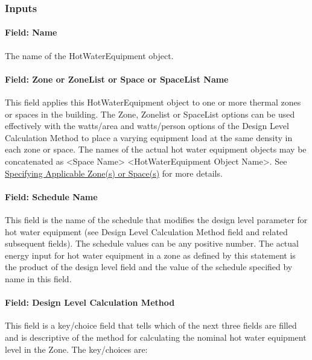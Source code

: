 \subsubsection{Inputs}\label{inputs-5-015}

\paragraph{Field: Name}\label{field-name-5-011}

The name of the HotWaterEquipment object.

\paragraph{Field: Zone or ZoneList or Space or SpaceList Name}\label{hweq-field-zone-or-zonelist-name-000}

This field applies this HotWaterEquipment object to one or more thermal zones or spaces in the building. The Zone, Zonelist or SpaceList options can be used effectively with the watts/area and watts/person options of the Design Level Calculation Method to place a varying equipment load at the same density in each zone or space. The names of the actual hot water equipment objects may be concatenated as \textless{}Space Name\textgreater{} \textless{}HotWaterEquipment Object Name\textgreater{}. See \hyperref[specifying-applicable-zones-or-spaces]{Specifying Applicable Zone(s) or Space(s)} for more details.

\paragraph{Field: Schedule Name}\label{field-schedule-name-3-000}

This field is the name of the schedule that modifies the design level parameter for hot water equipment (see Design Level Calculation Method field and related subsequent fields). The schedule values can be any positive number. The actual energy input for hot water equipment in a zone as defined by this statement is the product of the design level field and the value of the schedule specified by name in this field.

\paragraph{Field: Design Level Calculation Method}\label{field-design-level-calculation-method-3}

This field is a key/choice field that tells which of the next three fields are filled and is descriptive of the method for calculating the nominal hot water equipment level in the Zone. The key/choices are:

